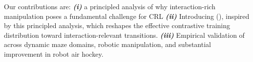 
Our contributions are: \textbf{\textit{(i)}} a principled analysis of why interaction-rich manipulation poses a fundamental challenge for CRL
\textbf{\textit{(ii)}} Introducing \methodname{} (\methodshort{}), inspired by this principled analysis, which reshapes the effective contrastive training distribution toward interaction-relevant transitions.
\textbf{\textit{(iii)}} Empirical validation of \methodshort{}
across dynamic maze domains, robotic manipulation, and substantial improvement in robot air hockey.
